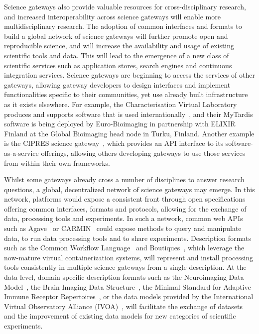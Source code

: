 \documentclass[review]{elsarticle}
\begin{document}
Science gateways also provide valuable resources for cross-disciplinary research, and increased interoperability across science gateways will enable more multidisciplinary research. The adoption of common interfaces and formats to build a global network of science gateways will further promote open and reproducible science, and will increase the availability and usage of existing scientific tools and data. This will lead to the emergence of a new class of scientific services such as application stores, search engines and continuous integration services. 
Science gateways are beginning to access the services of other gateways, allowing gateway developers to design interfaces and implement functionalities specific to their communities, yet use already built infrastructure as it exists elsewhere. 
For example, the Characterisation Virtual Laboratory produces and supports software that is used internationally~\cite{cvl}, and their MyTardis software is being deployed by Euro-Bioimaging in partnership with ELIXIR Finland at the Global Bioimaging head node in Turku, Finland. 
Another example is the CIPRES science gateway~\cite{Miller2012-40}, which provides an API interface to its software-as-a-service offerings, allowing others developing gateways to use those services from within their own frameworks.

Whilst some gateways already cross a number of disciplines to answer research questions, a global, decentralized network of science gateways may emerge. In this network, platforms would expose a consistent front through open specifications offering common interfaces, formats and protocols, allowing for the exchange of data, processing tools and experiments. In such a network, common web APIs such as Agave~\cite{agave-8} or CARMIN~\cite{carmin-9} could expose methods to query and manipulate data, to run data processing tools and to share experiments. Description formats such as the Common Workflow Language~\cite{cwl-10} and Boutiques~\cite{boutiques-11}, which leverage the now-mature virtual containerization systems, will represent and install processing tools consistently in multiple science gateways from a single description. At the data level, domain-specific description formats such as the Neuroimaging Data Model~\cite{nidm-12}, the Brain Imaging Data Structure~\cite{bids-13}, the Minimal Standard for Adaptive Immune Receptor Repertoires~\cite{rubelt-82,Breden-83}, or the data models provided by the International Virtual Observatory Alliance (IVOA)~\cite{ivoa-14}, will facilitate the exchange of datasets and the improvement of existing data models for new categories of scientific experiments. 
\end{document}
